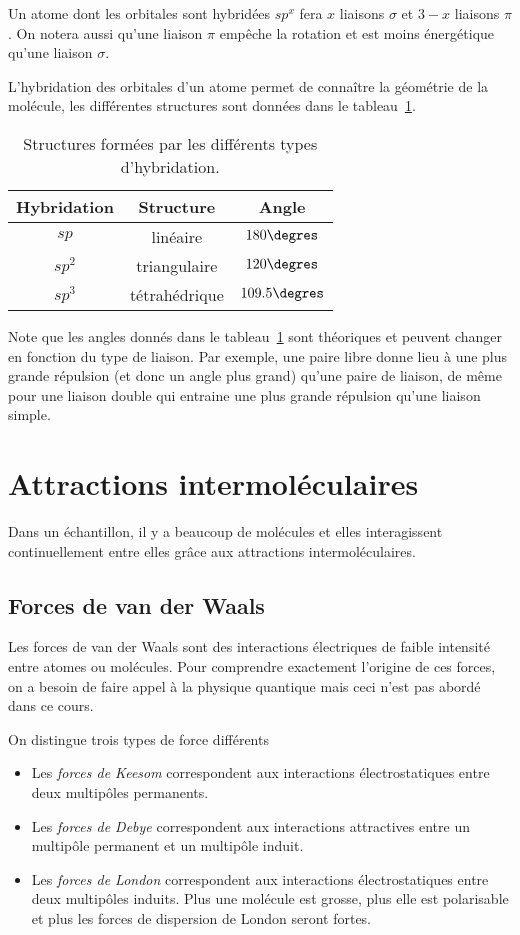 Un atome dont les orbitales sont hybridées $sp^x$ fera
$x$ liaisons $\sigma$ et $3-x$ liaisons $\pi$.
On notera aussi qu'une liaison $\pi$ emp\^eche la rotation 
et est moins énergétique qu'une liaison $\sigma$.

L'hybridation des orbitales d'un atome permet de conna\^itre la géométrie de la molécule, 
les différentes structures sont données dans le tableau~\ref{tab:geoHybridation}.

\begin{table}[h]
  \begin{center}
    \begin{tabular}{|c|c|c|}
    \hline
    Hybridation & Structure & Angle \\
    \hline
    $sp$ & linéaire & $180\degres$ \\
    \hline
    $sp^2$ & triangulaire & $120\degres$ \\
    \hline
    $sp^3$ & tétrahédrique & $109.5\degres$ \\
    \hline
    \end{tabular}
    \caption{Structures formées par les différents types d'hybridation.}
    \label{tab:geoHybridation}
  \end{center}
\end{table}
Note que les angles donnés dans le tableau~\ref{tab:geoHybridation} sont théoriques
et peuvent changer en fonction du type de liaison. 
Par exemple, une paire libre donne lieu à une plus grande répulsion 
(et donc un angle plus grand) qu'une paire de liaison, 
de même pour une liaison double qui entraine 
une plus grande répulsion qu'une liaison simple.

\section{Attractions intermoléculaires}
Dans un échantillon, il y a beaucoup de molécules et 
elles interagissent continuellement entre elles grâce aux attractions intermoléculaires.

\subsection{Forces de van der Waals}
Les forces de van der Waals sont des interactions électriques 
de faible intensité entre atomes ou molécules.
Pour comprendre exactement l'origine de ces forces, 
on a besoin de faire appel à la physique quantique 
mais ceci n'est pas abordé dans ce cours.

On distingue trois types de force différents
\begin{itemize}
  \item Les \emph{forces de Keesom} correspondent aux interactions électrostatiques 
  entre deux multip\^oles permanents.
  \item Les \emph{forces de Debye} correspondent aux interactions attractives 
  entre un multip\^ole permanent et un multip\^ole induit.
  \item Les \emph{forces de London} correspondent aux interactions électrostatiques 
  entre deux multip\^oles induits. 
  Plus une molécule est grosse, plus elle est polarisable et plus les forces de dispersion de London seront fortes. 
\end{itemize}

